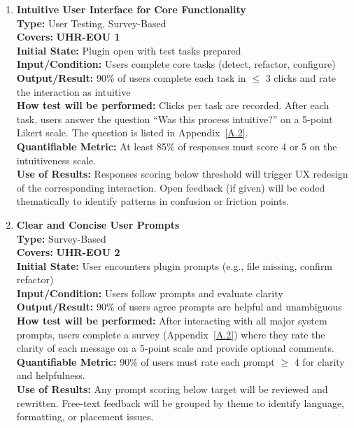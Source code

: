 \documentclass[12pt, titlepage]{article}
\begin{document}
\begin{enumerate}[label={\bf \textcolor{Maroon}{test-UH-\arabic*}}, wide=0pt, font=\itshape]
  \item \textbf{Intuitive User Interface for Core Functionality} \\[2mm]
    \textbf{Type:} User Testing, Survey-Based \\
    \textbf{Covers:} \textbf{UHR-EOU 1} \\ 
    \textbf{Initial State:} Plugin open with test tasks prepared \\
    \textbf{Input/Condition:} Users complete core tasks (detect, refactor, configure) \\
    \textbf{Output/Result:} 90\% of users complete each task in $\leq$ 3 clicks and rate the interaction as intuitive \\[2mm]
    \textbf{How test will be performed:} Clicks per task are recorded. After each task, users answer the question “Was this process intuitive?” on a 5-point Likert scale. The question is listed in Appendix~\ref{A.2}. \\
    \textbf{Quantifiable Metric:} At least 85\% of responses must score 4 or 5 on the intuitiveness scale. \\
    \textbf{Use of Results:} Responses scoring below threshold will trigger UX redesign of the corresponding interaction. Open feedback (if given) will be coded thematically to identify patterns in confusion or friction points.

  \item \textbf{Clear and Concise User Prompts} \\[2mm]
    \textbf{Type:} Survey-Based \\
    \textbf{Covers:} \textbf{UHR-EOU 2} \\ 
    \textbf{Initial State:} User encounters plugin prompts (e.g., file missing, confirm refactor) \\
    \textbf{Input/Condition:} Users follow prompts and evaluate clarity \\
    \textbf{Output/Result:} 90\% of users agree prompts are helpful and unambiguous \\[2mm]
    \textbf{How test will be performed:} After interacting with all major system prompts, users complete a survey (Appendix~\ref{A.2}) where they rate the clarity of each message on a 5-point scale and provide optional comments. \\
    \textbf{Quantifiable Metric:} 90\% of users must rate each prompt $\geq$ 4 for clarity and helpfulness. \\
    \textbf{Use of Results:} Any prompt scoring below target will be reviewed and rewritten. Free-text feedback will be grouped by theme to identify language, formatting, or placement issues.


\end{enumerate}
\end{document}
